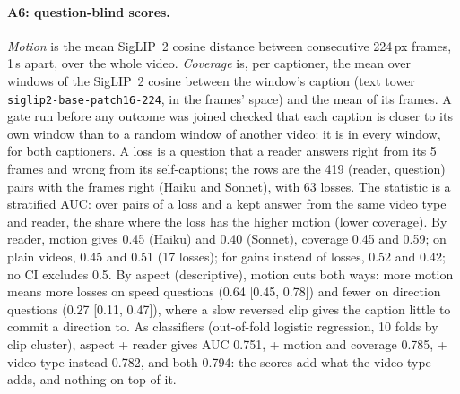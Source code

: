 \documentclass[11pt]{article}
\begin{document}
\paragraph{A6: question-blind scores.} \emph{Motion} is the mean SigLIP~2 cosine distance between consecutive 224\,px frames, 1\,s apart, over the whole video. \emph{Coverage} is, per captioner, the mean over windows of the SigLIP~2 cosine between the window's caption (text tower \texttt{siglip2-base-patch16-224}, in the frames' space) and the mean of its frames. A gate run before any outcome was joined checked that each caption is closer to its own window than to a random window of another video: it is in every window, for both captioners. A loss is a question that a reader answers right from its 5 frames and wrong from its self-captions; the rows are the 419 (reader, question) pairs with the frames right (Haiku and Sonnet), with 63 losses. The statistic is a stratified AUC: over pairs of a loss and a kept answer from the same video type and reader, the share where the loss has the higher motion (lower coverage). By reader, motion gives 0.45 (Haiku) and 0.40 (Sonnet), coverage 0.45 and 0.59; on plain videos, 0.45 and 0.51 (17 losses); for gains instead of losses, 0.52 and 0.42; no CI excludes 0.5. By aspect (descriptive), motion cuts both ways: more motion means more losses on speed questions (0.64 [0.45, 0.78]) and fewer on direction questions (0.27 [0.11, 0.47]), where a slow reversed clip gives the caption little to commit a direction to. As classifiers (out-of-fold logistic regression, 10 folds by clip cluster), aspect + reader gives AUC 0.751, + motion and coverage 0.785, + video type instead 0.782, and both 0.794: the scores add what the video type adds, and nothing on top of it.
\end{document}
